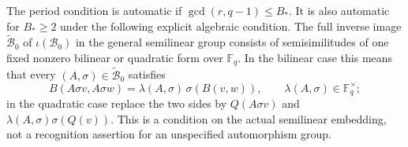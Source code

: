 \begin{corollary}
The period condition is automatic if
$\gcd(r,q-1)\le B_*$.
It is also automatic for $B_*\ge2$ under the following
explicit algebraic condition. The full inverse image
$\widetilde{\mathcal B}_0$ of $\iota(\mathcal B_0)$ in
the general semilinear group consists of semisimilitudes
of one fixed nonzero bilinear or quadratic form over
$\mathbb F_q$. In the bilinear case this means that
every $(A,\sigma)\in\widetilde{\mathcal B}_0$ satisfies
\[
 B(A\sigma v,A\sigma w)
       =\lambda(A,\sigma)\,\sigma(B(v,w)),
       \qquad \lambda(A,\sigma)\in\mathbb F_q^\times;
                                                        \tag{D.BS.3}
\]
in the quadratic case replace the two sides by
$Q(A\sigma v)$ and
$\lambda(A,\sigma)\sigma(Q(v))$.
This is a condition on the actual semilinear embedding,
not a recognition assertion for an unspecified
automorphism group.
\end{corollary}


